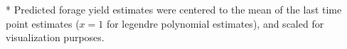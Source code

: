 \documentclass[12pt, letterpaper]{article}
\begin{document}




* Predicted forage yield estimates were centered to the mean of the last time point estimates ($x = 1$ for legendre polynomial estimates), and scaled for visualization purposes. 
\end{document}
